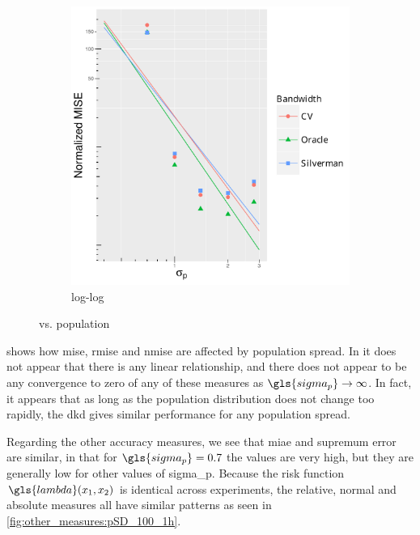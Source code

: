 \begin{figure}[htbp]
\begin{subfigure}[t]{0.24\textwidth}
        \caption{}
        \label{fig:ise:pSD_100_1h:nmise}
    \end{subfigure}
    \begin{subfigure}[t]{0.24\textwidth}
        \includegraphics[width=\textwidth]{results/by_population_spread/NMISE-vs-population-spread-log-log}
        \caption{ log-log}
        \label{fig:ise:pSD_100_1h:nmise_log_log}
    \end{subfigure}
    \caption[: by population ]{ vs. population }
    \label{fig:ise:pSD_100_1h}
\end{figure}

 shows how \gls{mise}, \gls{rmise} and \gls{nmise} are affected by population spread.
In  it does not appear that there is any linear relationship,
and there does not appear to be any convergence to zero of any of these measures as $\gls{sigma_p} \to \infty$.
In fact, it appears that as long as the population distribution does not change too rapidly,
the \gls{dkd} gives similar performance for any population \gls{spread}.

Regarding the other accuracy measures, we see that \gls{miae} and \gls{supremum error} are similar,
in that for $\gls{sigma_p} = 0.7$ the values are very high,
but they are generally low for other values of \gls{sigma_p}.
Because the risk function $\gls{lambda} \xvec$ is identical across experiments,
the relative, normal and absolute measures all have similar patterns
as seen in \cref{fig:other_measures:pSD_100_1h}.

